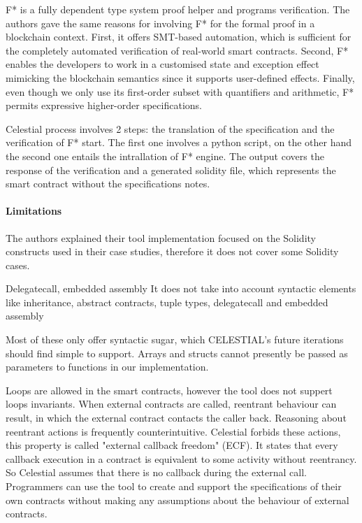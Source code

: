 F* is a fully dependent type system proof helper and programs verification. 
The authors gave the same reasons for involving F* for the formal proof in a blockchain context.
First, it offers SMT-based automation, which is sufficient for the completely automated verification of real-world smart contracts. 
Second, F* enables the developers to work in a customised state and exception effect mimicking the blockchain semantics since it supports user-defined effects. 
Finally, even though we only use its first-order subset with quantifiers and arithmetic, F* permits expressive higher-order specifications.

Celestial process involves 2 steps: the translation of the specification and the verification of F* start. 
The first one involves a python script, on the other hand the second one entails the intrallation of F* engine. 
The output covers the response of the verification and a generated solidity file, which represents the smart contract without the specifications notes. 

\paragraph{Limitations} 
The authors explained their tool implementation focused on the Solidity constructs used in their case studies, therefore it does not cover some Solidity cases. 

Delegatecall, embedded assembly
It does not take into account syntactic elements like inheritance, abstract contracts, tuple types, delegatecall and  embedded assembly

Most of these only offer syntactic sugar, which CELESTIAL's future iterations should find simple to support.
Arrays and structs cannot presently be passed as parameters to functions in our implementation. 

Loops are allowed in the smart contracts, however the tool does not suppert loops invariants.
When external contracts are called, reentrant behaviour can result, in which the external contract contacts the caller back.
Reasoning about reentrant actions is frequently counterintuitive.
Celestial forbids these actions, this property is called "external callback freedom" (ECF). It states that every callback execution 
in a contract is equivalent to some activity without reentrancy.
So Celestial assumes that there is no callback during the external call.
Programmers can use the tool to create and support the specifications of their own contracts without making any assumptions about the behaviour of external contracts. 

